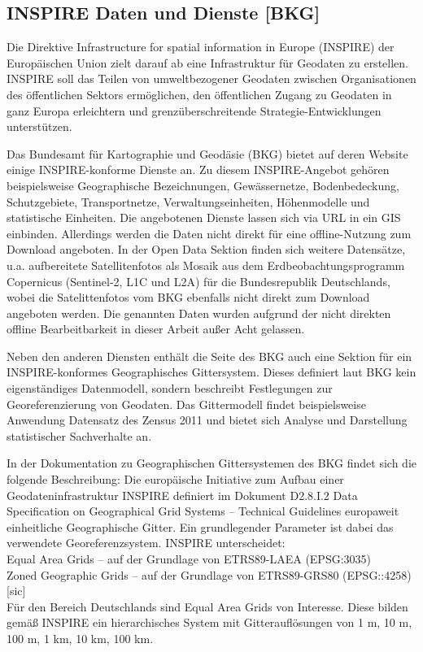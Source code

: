 		\subsection{INSPIRE Daten und Dienste [BKG]}
			Die Direktive Infrastructure for spatial information in Europe (INSPIRE) der Europäischen Union zielt darauf ab eine Infrastruktur für Geodaten zu erstellen. INSPIRE soll das Teilen von umweltbezogener Geodaten zwischen Organisationen des öffentlichen Sektors ermöglichen, den öffentlichen Zugang zu Geodaten in ganz Europa erleichtern und grenzüberschreitende Strategie-Entwicklungen unterstützen. \cite{web_inspire}
			
			Das Bundesamt für Kartographie und Geodäsie (BKG) bietet auf deren Website einige INSPIRE-konforme Dienste an. Zu diesem INSPIRE-Angebot gehören beispielsweise Geographische Bezeichnungen, Gewässernetze, Bodenbedeckung, Schutzgebiete, Transportnetze, Verwaltungseinheiten, Höhenmodelle und statistische Einheiten. Die angebotenen Dienste lassen sich via URL in ein GIS einbinden. Allerdings werden die Daten nicht direkt für eine offline-Nutzung zum Download angeboten. In der Open Data Sektion finden sich weitere Datensätze, u.a. aufbereitete Satellitenfotos als Mosaik aus dem Erdbeobachtungsprogramm Copernicus (Sentinel-2, L1C und L2A) für die Bundesrepublik Deutschlands, wobei die Satelittenfotos vom BKG ebenfalls nicht direkt zum Download angeboten werden. Die genannten Daten wurden aufgrund der nicht direkten offline Bearbeitbarkeit in dieser Arbeit außer Acht gelassen. \cite{web_inspire_bkg}
			
			Neben den anderen Diensten enthält die Seite des BKG auch eine Sektion für ein INSPIRE-konformes Geographisches Gittersystem. Dieses definiert laut BKG kein eigenständiges Datenmodell, sondern beschreibt Festlegungen zur Georeferenzierung von Geodaten. Das Gittermodell findet beispielsweise Anwendung Datensatz des Zensus 2011 und bietet sich Analyse und Darstellung statistischer Sachverhalte an. \cite{web_inspire_bkg}
			
			In der Dokumentation zu Geographischen Gittersystemen des BKG findet sich die folgende Beschreibung: \frqq Die europäische Initiative zum Aufbau einer Geodateninfrastruktur INSPIRE definiert im Dokument D2.8.I.2
			Data Specification on Geographical Grid Systems – Technical Guidelines europaweit einheitliche Geographische Gitter. Ein grundlegender Parameter ist dabei das verwendete Georeferenzsystem. INSPIRE unterscheidet:\\
			\quad Equal Area Grids – auf der Grundlage von ETRS89-LAEA (EPSG:3035)\\
			\quad Zoned Geographic Grids – auf der Grundlage von ETRS89-GRS80 (EPSG::4258) [sic]\\
			Für den Bereich Deutschlands sind Equal Area Grids von Interesse. Diese bilden gemäß INSPIRE ein hierarchisches System mit Gitterauflösungen von 1 m, 10 m, 100 m, 1 km, 10 km, 100 km.\flqq \cite{web_inspire_bkg_gittersysteme}
				
